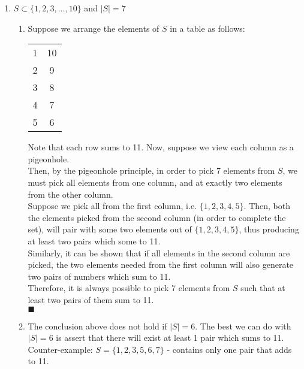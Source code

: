 \documentclass[a4paper,12pt]{article} %
\begin{document}
\begin{enumerate}
\item $S \subset \{1, 2, 3, \dots, 10\}$ and $|S| = 7$
	\begin{enumerate}
		\item Suppose we arrange the elements of $S$ in a table as follows:
			\begin{center}
			\begin{tabular}{ c c }
			 1 & 10 \\ 
			 2 & 9 \\  
			 3 & 8 \\
			 4 & 7 \\
			 5 & 6 \\
			\end{tabular}
			\end{center}
			Note that each row sums to 11. Now, suppose we view each column as a pigeonhole.\\
			Then, by the pigeonhole principle, in order to pick 7 elements from $S$, we must pick all elements from one column, and at exactly two elements from the other column.\\
			Suppose we pick all from the first column, i.e. $\{1, 2, 3, 4, 5\}$. Then, both the elements picked from the second column (in order to complete the set), will pair with some two elements out of $\{1, 2, 3, 4, 5\}$, thus producing at least two pairs which some to 11.\\
			Similarly, it can be shown that if all elements in the second column are picked, the two elements needed from the first column will also generate two pairs of numbers which sum to 11.\\
			Therefore, it is always possible to pick 7 elements from $S$ such that at least two pairs of them sum to 11.\\
			$\blacksquare$
		\item The conclusion above does not hold if $|S| = 6$. The best we can do with $|S| = 6$ is assert that there will exist at least 1 pair which sums to 11.\\
			Counter-example: $S = \{1, 2, 3, 5, 6, 7\}$ - contains only one pair that adds to 11.
	\end{enumerate}

\end{enumerate}
\end{document}
